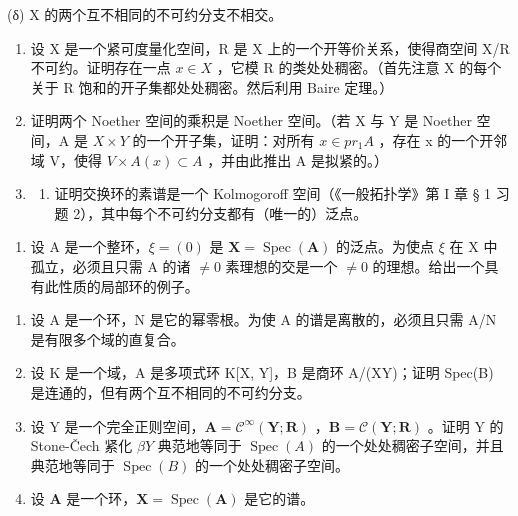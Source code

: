 (δ) X 的两个互不相同的不可约分支不相交。

\begin{enumerate}
\def\labelenumi{\arabic{enumi}.}
\setcounter{enumi}{6}
\item
  设 X 是一个紧可度量化空间，R 是 X 上的一个开等价关系，使得商空间 X/R 不可约。证明存在一点 \(x \in X\) ，它模 R 的类处处稠密。（首先注意 X 的每个关于 R 饱和的开子集都处处稠密。然后利用 Baire 定理。）
\item
  证明两个 Noether 空间的乘积是 Noether 空间。（若 X 与 Y 是 Noether 空间，A 是 \(X \times Y\) 的一个开子集，证明：对所有 \(x \in pr_{1}A\) ，存在 x 的一个开邻域 V，使得 \(V \times A(x) \subset A\) ，并由此推出 A 是拟紧的。）
\item
  \begin{enumerate}
  \def\labelenumii{(\alph{enumii})}
  \tightlist
  \item
    证明交换环的素谱是一个 Kolmogoroff 空间（《一般拓扑学》第 I 章 § 1 习题 2），其中每个不可约分支都有（唯一的）泛点。
  \end{enumerate}
\end{enumerate}

\begin{enumerate}
\def\labelenumi{(\alph{enumi})}
\setcounter{enumi}{1}
\tightlist
\item
  设 A 是一个整环，\(\xi = (0)\) 是 \(\mathbf{X} = \operatorname{Spec}(\mathbf{A})\) 的泛点。为使点 \(\xi\) 在 X 中孤立，必须且只需 A 的诸 \(\neq 0\) 素理想的交是一个 \(\neq 0\) 的理想。给出一个具有此性质的局部环的例子。
\end{enumerate}

\begin{enumerate}
\def\labelenumi{\arabic{enumi}.}
\setcounter{enumi}{9}
\item
  设 A 是一个环，N 是它的幂零根。为使 A 的谱是离散的，必须且只需 A/N 是有限多个域的直复合。
\item
  设 K 是一个域，A 是多项式环 K{[}X, Y{]}，B 是商环 A/(XY)；证明 Spec(B) 是连通的，但有两个互不相同的不可约分支。
\item
  设 Y 是一个完全正则空间，\(\mathbf{A} = \mathcal{C}^{\infty}(\mathbf{Y}; \mathbf{R})\) ，\(\mathbf{B} = \mathcal{C}(\mathbf{Y}; \mathbf{R})\) 。证明 Y 的 Stone-Čech 紧化 \(\beta Y\) 典范地等同于 \(\operatorname{Spec}(A)\) 的一个处处稠密子空间，并且典范地等同于 \(\operatorname{Spec}(B)\) 的一个处处稠密子空间。
\item
  设 \(\mathbf{A}\) 是一个环，\(\mathbf{X} = \operatorname{Spec}(\mathbf{A})\) 是它的谱。
\end{enumerate}

